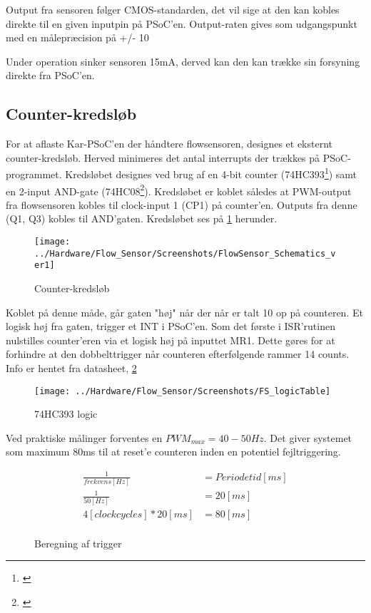 Output fra sensoren følger CMOS-standarden, det vil sige at den kan kobles direkte til en given inputpin på PSoC'en. Output-raten gives som udgangspunkt med en målepræcision på +/- 10%
 
Under operation sinker sensoren 15mA, derved kan den kan trække sin forsyning direkte fra PSoC'en.

\subsection{Counter-kredsløb}
For at aflaste Kar-PSoC'en der håndtere flowsensoren, designes et eksternt counter-kredsløb. Herved minimeres det antal interrupts der trækkes på PSoC-programmet. Kredsløbet designes ved brug af en 4-bit counter (74HC393\footnote{\citet{nxp:74HC393}}) samt en 2-input AND-gate (74HC08\footnote{\citet{nxp:74HC08}}). 
Kredsløbet er koblet således at PWM-output fra flowsensoren kobles til clock-input 1 (CP1) på counter'en. Outputs fra denne (Q1, Q3) kobles til AND'gaten.
Kredsløbet ses på \ref{screenshot:counter} herunder. 

\begin{figure}[H]
	\centering
	\texttt{[image: ../Hardware/Flow\_Sensor/Screenshots/FlowSensor\_Schematics\_ver1]}
	\caption{Counter-kredsløb}
	\label{screenshot:counter}
\end{figure}

Koblet på denne måde, går gaten "høj" når der når er talt 10 op på counteren. Et logisk høj fra gaten, trigger et INT i PSoC'en. Som det første i ISR'rutinen nulstilles counter'eren via et logisk høj på inputtet MR1. Dette gøres for at forhindre at den dobbelttrigger når counteren efterfølgende rammer 14 counts. Info er hentet fra datasheet, \ref{screenshot:logicTable}

\begin{figure}[H]
	\centering
	\texttt{[image: ../Hardware/Flow\_Sensor/Screenshots/FS\_logicTable]}
	\caption{74HC393 logic}
	\label{screenshot:logicTable}
\end{figure}

Ved praktiske målinger forventes en $PWM_{max}=40-50Hz$.
Det giver systemet som maximum 80ms til at reset'e counteren inden en potentiel fejltriggering.

\begin{figure}[H]
    \begin{align*}
       \frac{1}{frekvens[Hz]} &= Periodetid[ms] \\
       \frac{1}{50[Hz]} &= 20[ms] \\
       4[clockcycles]*20[ms] &= 80[ms] \\ 
    \end{align*}
\label{eq:Trigger}
\caption{Beregning af trigger}
\end{figure}

